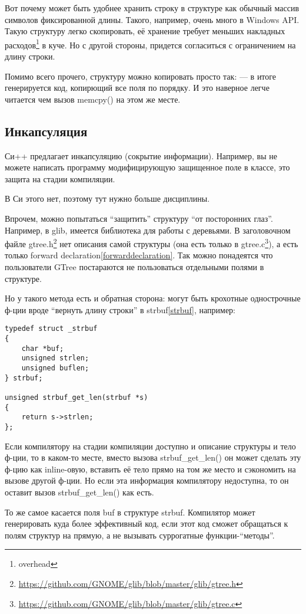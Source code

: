 Вот почему может быть удобнее хранить строку в структуре как обычный массив символов фиксированной длины.
Такого, например, очень много в Windows API. Такую структуру легко скопировать, её хранение
требует меньших накладных расходов\footnote{overhead} в куче. 
Но с другой стороны, придется согласиться с ограничением на длину строки.

Помимо всего прочего, структуру можно копировать просто так:  --- в итоге генерируется код,
копирющий все поля по порядку. И это наверное легче читается чем вызов memcpy() на этом же месте.

\subsection{Инкапсуляция}

Си++ предлагает инкапсуляцию (сокрытие информации). Например, вы не можете
написать программу модифицирующую защищенное поле в классе, 
это защита на стадии компиляции\cite[1.7.3]{REBook}.

В Си этого нет, поэтому тут нужно больше дисциплины.

Впрочем, можно попытаться ``защитить'' структуру ``от посторонних глаз''. Например, в glib,
имеется библиотека для работы с деревьями. В заголовочном файле 
gtree.h\footnote{\url{https://github.com/GNOME/glib/blob/master/glib/gtree.h}} нет описания самой структуры
(она есть только в gtree.c\footnote{\url{https://github.com/GNOME/glib/blob/master/glib/gtree.c}}), 
а есть только forward declaration\ref{forwarddeclaration}. Так можно понадеятся что
пользователи GTree постараются не пользоваться отдельными полями в структуре.

Но у такого метода есть и обратная сторона: могут быть крохотные однострочные ф-ции вроде 
``вернуть длину строки'' в strbuf\ref{strbuf}, например:

\begin{lstlisting}
typedef struct _strbuf
{
    char *buf;
    unsigned strlen;
    unsigned buflen;
} strbuf;

unsigned strbuf_get_len(strbuf *s)
{
	return s->strlen;
};
\end{lstlisting}

Если компилятору на стадии компиляции доступно и описание структуры и тело ф-ции, то в каком-то месте,
вместо вызова strbuf\_get\_len() он может сделать эту ф-цию как inline-овую, вставить её тело прямо на том
же место и сэкономить на вызове другой ф-ции. Но если эта информация компилятору недоступна, то он
оставит вызов strbuf\_get\_len() как есть.

То же самое касается поля buf в структуре strbuf. Компилятор может генерировать куда более эффективный
код, если этот код сможет обращаться к полям структур на прямую, а не вызывать суррогатные 
функции-``методы''.


